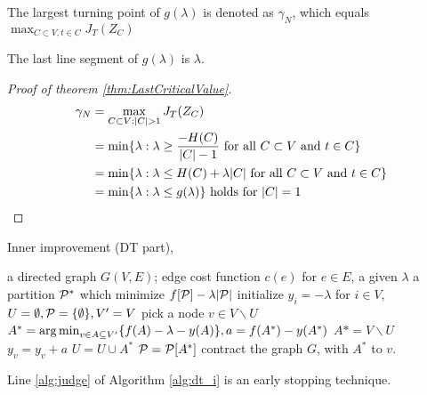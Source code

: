 \documentclass{article}
\begin{document}
\begin{theorem}\label{thm:LastCriticalValue}
The largest turning point of $g(\lambda)$ is denoted as $\gamma_N$, which equals $\max_{C\subset V, t\in C}J_T(Z_C)$
\end{theorem}

The last line segment of $g(\lambda)$ is $\lambda$.
\begin{proof}[Proof of theorem \ref{thm:LastCriticalValue}]
\begin{align*}
\gamma_N & = \max_{C\subset V: \abs{C}>1} J_T(Z_C) \\
& = \min\{\lambda : \lambda \geq \frac{-H(C)}{\abs{C}-1} \textrm{ for all $C\subset V$ and $ t\in C$}\} \\
& = \min\{\lambda : \lambda \leq H(C)+\lambda\abs{C} \textrm{ for all $C\subset V$ and $t \in C$}\} \\
& = \min\{\lambda : \lambda \leq g(\lambda) \} \textrm{ holds for } \abs{C}=1
\end{align*}
\end{proof}

Inner improvement (DT part),
\begin{algorithm}
\caption{}\label{alg:dt_i}
\begin{algorithmic}[1]
\REQUIRE a directed graph $G(V, E)$; edge cost function $c(e)$ for $e\in E$, a given $\lambda$
\ENSURE a partition $\P^*$ which minimize $f[\P] - \lambda \abs{\P}$
\STATE initialize $y_i = -\lambda$ for $ i \in V$, $U = \emptyset, \P = \{\emptyset\}, V' = V$
\STATE pick a node $v \in V\backslash U$
\STATE $A^* = \argmin_{v \in A \subseteq V'} \{ f(A) - \lambda - y(A)\}, a = f(A^*) - y(A^*)$
 \label{alg:judge}
\STATE $A* = V \backslash U$
\ENDIF
\STATE $y_v = y_v + a$
\STATE $U = U \cup A^*$
\STATE $\P= \P[A^*]$
\STATE contract the graph $G$, with $A^*$ to $v$.
\ENDWHILE
\end{algorithmic}
\end{algorithm}
Line \ref{alg:judge} of Algorithm \ref{alg:dt_i} is an early stopping technique.
\end{document}
